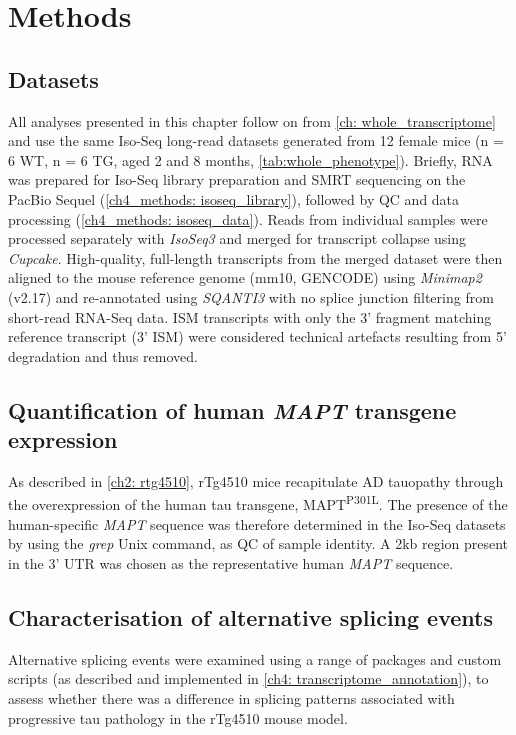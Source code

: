 \newpage
\section{Methods}

\subsection{Datasets}
All analyses presented in this chapter follow on from \cref{ch: whole_transcriptome} and use the same Iso-Seq long-read datasets generated from 12 female mice (n = 6 WT, n = 6 TG, aged 2 and 8 months, \cref{tab:whole_phenotype}). Briefly, RNA was prepared for Iso-Seq library preparation and SMRT sequencing on the PacBio Sequel (\cref{ch4_methods: isoseq_library}), followed by QC and data processing (\cref{ch4_methods: isoseq_data}). Reads from individual samples were processed separately with \textit{IsoSeq3} and merged for transcript collapse using \textit{Cupcake}. High-quality, full-length transcripts from the merged dataset were then aligned to the mouse reference genome (mm10, GENCODE) using \textit{Minimap2} (v2.17) and re-annotated using \textit{SQANTI3} with no splice junction filtering from short-read RNA-Seq data. ISM transcripts with only the 3' fragment matching reference transcript (3' ISM) were considered technical artefacts resulting from 5' degradation and thus removed.  

\subsection{Quantification of human \textit{MAPT} transgene expression}
\label{ch5: hmapt_quant}
As described in \cref{ch2: rtg4510}, rTg4510 mice recapitulate AD tauopathy through the overexpression of the human tau transgene, MAPT\textsuperscript{P301L}. The presence of the human-specific \textit{MAPT} sequence was therefore determined in the Iso-Seq datasets by using the \textit{grep} Unix command, as QC of sample identity. A 2kb region present in the 3' UTR was chosen as the representative human \textit{MAPT} sequence\cite{Castanho2020}.

\subsection{Characterisation of alternative splicing events} 
Alternative splicing events were examined using a range of packages and custom scripts (as described and implemented in \cref{ch4: transcriptome_annotation}), to assess whether there was a difference in splicing patterns associated with progressive tau pathology in the rTg4510 mouse model. 

